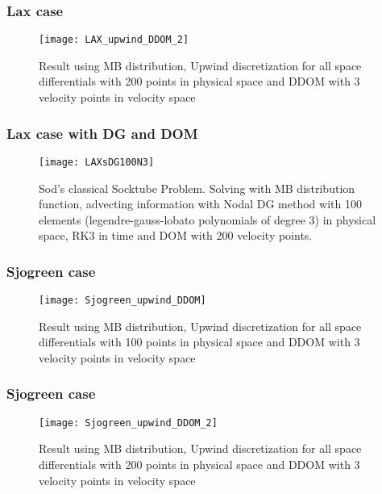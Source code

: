 \begin{frame}
	\frametitle{Lax case}
		
		\begin{figure}
			\centering
				\texttt{[image: LAX\_upwind\_DDOM\_2]}
			\caption{Result using MB distribution, Upwind discretization for all space differentials with 200 points in physical space and DDOM with 3 velocity points in velocity space}
			\label{fig:MB_Lax_DDOM_2}
		\end{figure}
		
\end{frame}

\begin{frame}
	\frametitle{Lax case with DG and DOM}
			
		\begin{figure}
			\centering
				\texttt{[image: LAXsDG100N3]}
			\caption{Sod's classical Socktube Problem. Solving with MB distribution function, advecting information with Nodal DG method with 100 elements (legendre-gauss-lobato polynomials of degree 3) in physical space, RK3 in time and DOM with 200 velocity points.}
			\label{fig:LAXsDG100N3}
		\end{figure}
	
\end{frame}

\begin{frame}
	\frametitle{Sjogreen case}
		
		\begin{figure}
			\centering
				\texttt{[image: Sjogreen\_upwind\_DDOM]}
			\caption{Result using MB distribution, Upwind discretization for all space differentials with 100 points in physical space and DDOM with 3 velocity points in velocity space}
			\label{fig:MB_Sjogreen_DDOM}
		\end{figure}
		
\end{frame}

\begin{frame}
	\frametitle{Sjogreen case}
		
		\begin{figure}
			\centering
				\texttt{[image: Sjogreen\_upwind\_DDOM\_2]}
			\caption{Result using MB distribution, Upwind discretization for all space differentials with 200 points in physical space and DDOM with 3 velocity points in velocity space}
			\label{fig:MB_Sjogreen_DDOM_2}
		\end{figure}
		
\end{frame}

